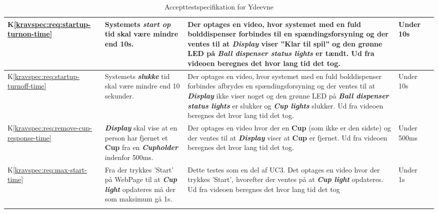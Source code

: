 \documentclass[Accepttestspecifikation/Accepttest_Main.tex]{subfiles}
\begin{document}
\begin{longtable}{|L{0.08\textwidth}|L{0.3\textwidth}|L{0.3\textwidth}|L{0.2\textwidth}|L{0.2\textwidth}|}
K\ref{kravspec:req:startup-turnon-time} & Systemets \textbf{\textit{start op}} tid skal være mindre end 10s. & Der optages en video, hvor systemet med en fuld bolddispenser forbindes til en spændingsforsyning og der ventes til at \textbf{\textit{Display}} viser ''Klar til spil'' og den grønne LED på \textbf{\textit{Ball dispenser status lights}} er tændt. Ud fra videoen beregnes det hvor lang tid det tog. & Under 10s &  \\ \hline
K\ref{kravspec:req:startup-turnoff-time} & Systemets \textbf{\textit{slukke}} tid skal være mindre end 10 sekunder. & Der optages en video, hvor systemet med en fuld bolddispenser forbindes afbrydes en spændingsforsyning og der ventes til at \textbf{\textit{Display}} ikke viser noget og den grønne LED på \textbf{\textit{Ball dispenser status lights}} er slukker og \textbf{\textit{Cup lights}} slukker. Ud fra videoen beregnes det hvor lang tid det tog. & Under 10s  &  \\ \hline
K\ref{kravspec:req:remove-cup-response-time} & \textit{\textbf{Display}} skal vise at en person har fjernet et \textbf{Cup} fra en \textit{\textbf{Cupholder}} indenfor 500ms. & Der optages en video hvor der en \textbf{Cup} (som ikke er den sidste) og der ventes til at \textbf{\textit{Display}} viser at \textbf{Cup} er fjernet. Ud fra videoen beregnes det hvor lang tid det tog. & Under 500ms&  \\ \hline
K\ref{kravspec:req:max-start-time} & Fra der trykkes 'Start' på WebPage til at \textbf{\textit{Cup light}} opdateres må der som maksimum gå 1s. & Dette testes som en del af UC3. Det optages en video hvor der trykkes 'Start', hvorefter der ventes på at \textbf{\textit{Cup light}} opdateres. Ud fra videoen beregnes det hvor lang tid det tog & Under 1s & \\ \hline
\caption{Accepttestspecifikation for Ydeevne}
\label{tab:IkkeFunktYdeevne}
\end{longtable}
\end{document}
